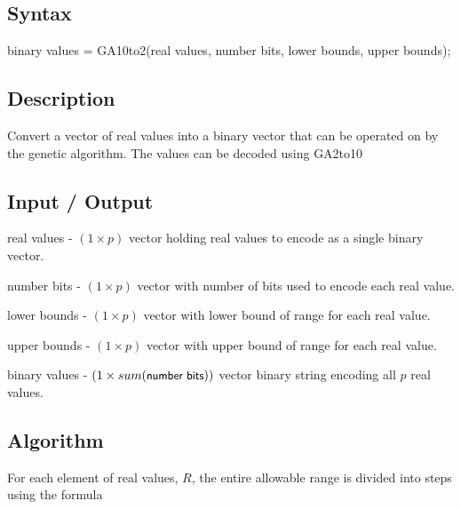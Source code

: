 \documentclass{book}
\newcommand{\textcode}[1]{\textsf{\small #1}}   %
\begin{document}
\subsection*{Syntax}

\textcode{binary values = GA10to2(real values, number bits,
lower bounds, upper bounds);}

\subsection*{Description}

Convert a vector of real values into a binary vector that can be operated on
by the genetic algorithm. The values can be decoded using \textcode{%
GA2to10}

\subsection*{Input / Output}

\begin{compactitem}

\item \textcode{real values} - $\left( 1 \times p \right)$ vector holding real values to encode as a single binary vector.

\item \textcode{number bits} - $\left( 1 \times p \right)$ vector with number of bits used to encode each real value.

\item \textcode{lower bounds} - $\left( 1 \times p \right)$ vector with lower bound of range for each real value.

\item \textcode{upper bounds} - $\left( 1 \times p \right)$ vector with upper bound of range for each real value.

\item \textcode{binary values} - $\left(1 \times sum(\textcode{number bits}) \right)$ vector binary string encoding all $p$ real values.

\end{compactitem}

\subsection*{Algorithm}

For each element of \textcode{real values}, $R$, the entire
allowable range is divided into steps using the formula
\end{document}
